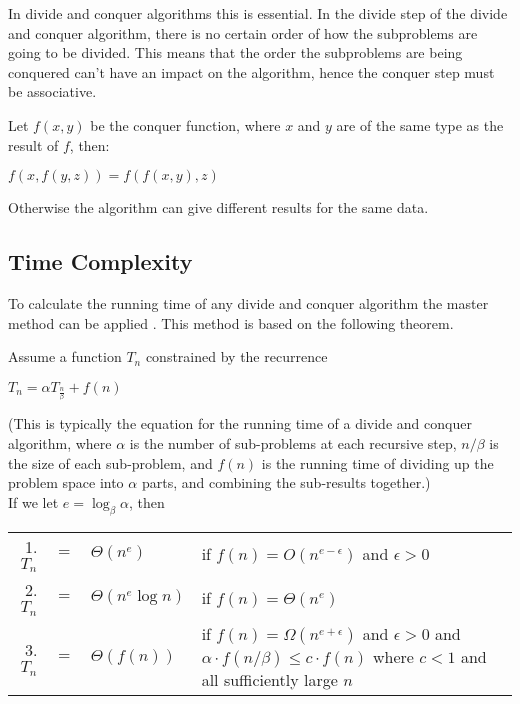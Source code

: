 In divide and conquer algorithms this is essential. In the divide step of the
divide and conquer algorithm, there is no certain order of how the subproblems
are going to be divided. This means that the order the subproblems are being
conquered can't have an impact on the algorithm, hence the conquer step must be
associative.

\begin{example}\label{assprop}
Let $f(x,y)$ be the conquer function, where $x$ and $y$ are of the same type as
the result of $f$, then:
\begin{center}
$f(x,f(y,z)) = f(f(x,y),z)$
\end{center}
Otherwise the algorithm can give different results for the same data.
\end{example}

\subsection{Time Complexity}
To calculate the running time of any divide and conquer algorithm the master
method can be applied \cite{Cormen}. This method is based on the following
theorem.
\begin{theorem} $ $\\
Assume a function $T_n$ constrained by the recurrence
\begin{center}
$T_n = {\alpha}T_{\frac{n}{\beta}}+ f(n)$
\end{center}
(This is typically the equation for the running time of a divide and conquer
algorithm, where $\alpha$ is the number of sub-problems at each recursive step,
$n/\beta$ is the size of each sub-problem, and $f(n)$ is the running time of
dividing up the problem space into $\alpha$ parts, and combining the sub-results
together.)\\
If we let $e = \log_\beta \alpha$, then
\begin{center}
\begin{tabular}{r c l l}
1. $T_n$ & $=$ & $\Theta(n^{e})$ &  if $f(n) = O(n^{e - \epsilon})$ and $\epsilon > 0$\\
2. $T_n$ & $=$ & $\Theta(n^{e} \log n)$ & if $f(n) = \Theta(n^e)$\\
3. $T_n$ & $=$ & $\Theta(f(n))$ & \begin{minipage}[t]{0.6 \columnwidth}
  if $f(n) = \Omega(n^{e+\epsilon})$ and $\epsilon > 0$
  and $\alpha \cdot f(n/\beta) \leq c \cdot f(n)$
  where $c < 1$ and all sufficiently large $n$
  \end{minipage}
\end{tabular}
\end{center}
\qeda
\end{theorem}


